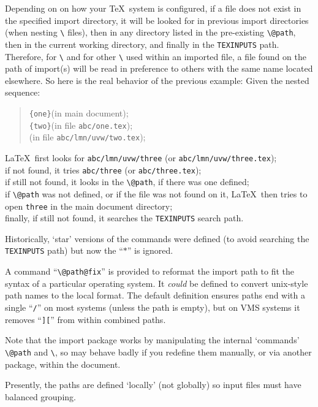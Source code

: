 \documentclass[DIV=8, parskip=half, pagesize=auto]{scrartcl}
\makeatletter
\newcommand*{\cs}[1]{\texttt{\textbackslash#1}}
\newcommand*{\cmd}[1]{\cs{\expandafter\@gobble\string#1}}
\renewcommand{\^}{\nolinebreak[2]}
\makeatother
\begin{document}
Depending on on how your \TeX\ system is configured, if a file does not
exist in the specified import directory, it will be looked for in previous
import directories (when nesting \cmd{} files), then in any
directory listed in the pre-existing \cmd{@path}, then in the current 
working directory, and finally in the \texttt{TEXINPUTS} path. Therefore, for 
\cmd{} and for other \cmd{} used within an imported file,
a file found on the path of import(s) will be read in preference to others with
the same name located elsewhere. So here is the real behavior of the previous
example: Given the nested sequence:
\begin{verse}
\verb+{one}+\quad (in main document);\\
\verb+{two}+\quad (in file \texttt{abc/one.tex});\\
\verb++\quad (in file \texttt{abc/lmn/uvw/two.tex});
\end{verse}
\LaTeX\ first looks for \texttt{abc/lmn/uvw/three} (or \texttt{abc/lmn/uvw/three.tex});\\
if not found, it tries \texttt{abc/three} (or \texttt{abc/three.tex});\\
if still not found, it looks in the \cmd{@path}, if there was one defined;\\
if \cmd{@path} was not defined, or if the file was not found on it,
\LaTeX\ then tries to open \texttt{three} in the main document directory;\\
finally, if still not found, it searches the \texttt{TEXINPUTS} search path.

Historically, `star' versions of the commands were defined (to avoid searching
the \texttt{TEXINPUTS} path) but now the ``$*$'' is ignored.


A command  ``\cmd{@path@fix}'' is provided to reformat the import path
to fit the syntax of a particular operating system.  It \emph{could} be
defined to convert unix-style path names to the local format. The default
definition ensures paths end with a single ``\texttt{/}'' on most systems
(unless the path is empty), but on VMS systems it removes
``\texttt{]\hspace{-2pt}[}'' from within combined paths.

Note that the import package works by manipulating the internal `commands'
\cmd{@path} and \cmd{\Ginput@path}, so may behave badly if you
redefine them manually, or via another package, within the document.

Presently, the paths are defined `locally' (not globally) so input files must
have balanced grouping.
\end{document}
